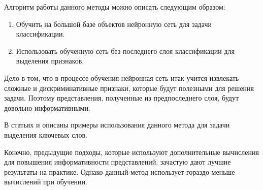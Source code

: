 Алгоритм работы данного методы можно описать следующим образом:
\begin{enumerate} 
    \item Обучить на большой базе объектов нейронную сеть для задачи классификации.
    \item Использовать обученную сеть без последнего слоя классификации для выделения признаков.
\end{enumerate}

Дело в том, что в процессе обучения нейронная сеть итак учится извлекать сложные и дискриминативные признаки, которые будут полезными для решения задачи. Поэтому представления, полученные из предпоследнего слоя, будут довольно информативными.  

В статьях \cite{lin2020training} и \cite{Mazumder_2021} описаны примеры использования данного метода для задачи выделения ключевых слов.

Конечно, предыдущие подходы, которые используют дополнительные вычисления для повышения информативности представлений, зачастую дают лучшие результаты на практике. Однако данный метод использует гораздо меньше вычислений при обучении.
